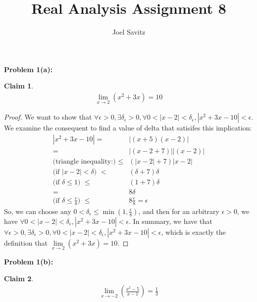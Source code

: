 \documentclass{article}
\title{Real Analysis Assignment 8}
\author{Joel Savitz}
\newcommand{\eps}{\ensuremath{\epsilon}}
\newtheorem{clm}{Claim}
\begin{document}
\maketitle

\textbf{Problem 1(a):}

\begin{clm}
	\begin{align}
	\lim_{x\to 2} (x^2 + 3x) = 10
	\end{align}
\end{clm}

\begin{proof}
	We want to show that
	$\forall \eps > 0, \exists \delta_\eps > 0,
	\forall 0 < |x - 2| < \delta_\eps, |x^2 + 3x - 10| < \eps$.
	We examine the consequent to find a value of delta
	that satisifes this implication:
	\begin{align}
		|x^2 + 3x - 10| = & |(x+5)(x-2)| \\
				= & |(x - 2 + 7)||(x - 2)| \\
		\textrm{(triangle inequality:) }\le & (|x - 2| + 7)|x-2| \\
		\textrm{(if $|x - 2| < \delta$) } < & (\delta + 7)\delta \\
		\textrm{(if  $\delta \le 1$) } \le & (1 + 7)\delta \\
				= & 8\delta \\
			\textrm{(if $\delta \le \frac{\eps}{8}$) } \le & 8\frac{\eps}{8} = \eps
	\end{align}
	So, we can choose any $0 < \delta_\eps \le \min(1, \frac{\eps}{8})$,
	and then for an arbitrary $\eps > 0$,
	we have 
	$\forall 0 < |x - 2| < \delta_\eps, |x^2 + 3x - 10| < \eps$.
	In summary,
	we have that
	$\forall \eps > 0,
	\exists \delta_\eps > 0,
	\forall 0 < |x - 2| < \delta_\eps,
	|x^2+3x-10| < \eps$,
	which is exactly the definition that 
	$\underset{x\to 2}{\lim} (x^2 + 3x) = 10$.
\end{proof}

\textbf{Problem 1(b):}

\begin{clm}
	\begin{align}
		\lim_{x\to -2} (\frac{x^2 - 5}{x - 1}) = \frac{1}{3}
	\end{align}
\end{clm}
\end{document}
